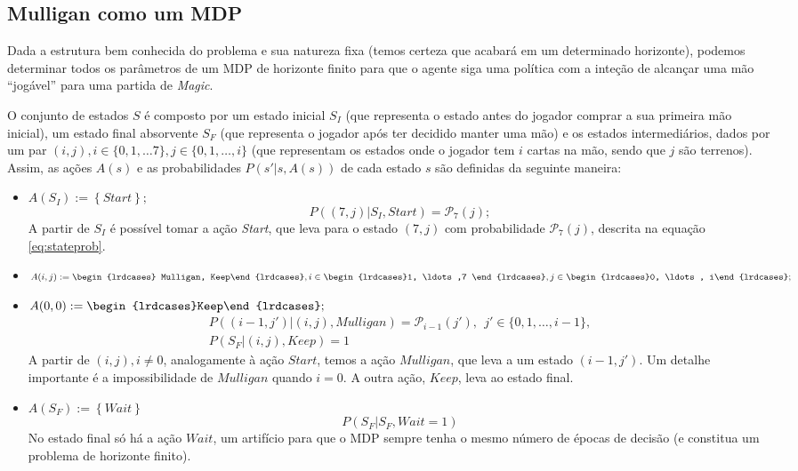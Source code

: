 \documentclass[dvipsnames]{book}
\begin{document}
\pagebreak
\subsection{Mulligan como um MDP}

Dada a estrutura bem conhecida do problema e sua natureza fixa (temos certeza que acabará em um
determinado horizonte), podemos determinar todos os parâmetros de um MDP de horizonte finito para
que o agente siga uma política com a inteção de alcançar uma mão ``jogável'' para uma partida de
\textit{Magic}.

O conjunto de estados $S$ é composto por um estado inicial $S_I$ (que representa o estado antes
do jogador comprar a sua primeira mão inicial), um estado final absorvente $S_F$ (que representa
o jogador após ter decidido manter uma mão) e os estados intermediários, dados por um par $(i, j),
i \in \{ 0, 1, \ldots 7\}, j \in \{ 0, 1, \ldots, i \}$ (que representam os estados onde o jogador
tem $i$ cartas na mão, sendo que $j$ são terrenos). Assim, as ações $A(s)$ e as probabilidades
$P(s'|s, A(s))$ de cada estado $s$ são definidas da seguinte maneira:

\begin{itemize}
  \item $A(S_I) := \left\{ Start \right\};$
  \begin{equation*}
    P((7, j) | S_I, Start) =  \mathcal{P}_7(j);
  \end{equation*}
   A partir de $S_I$ é possível tomar a ação \textit{Start}, que leva para o estado $(7, j)$ com
   probabilidade $\mathcal{P}_7(j)$, descrita na equação \ref{eq:stateprob}.
  \item $A(i, j):= \begin{lrdcases} Mulligan, Keep\end{lrdcases}, i\in\begin{lrdcases}1, \ldots ,7 \end{lrdcases}, j \in \begin{lrdcases}0, \ldots, i\end{lrdcases};$
  \item $A(0, 0):=\begin{lrdcases}Keep\end{lrdcases};$
  \begin{gather*}
    P((i - 1, j')| (i, j), Mulligan) = \mathcal{P}_{i-1}(j'),\ \ j' \in \{0,1, \ldots, i-1\},\\
    P(S_F|(i, j), Keep) = 1
  \end{gather*}
   A partir de $(i, j), i \neq 0$, analogamente à ação $Start$, temos a ação $Mulligan$, que leva a um estado
   $(i -1, j')$. Um detalhe importante é a impossibilidade de $Mulligan$ quando $i = 0$. A outra ação,
   $Keep$, leva ao estado final.
   \item $A(S_F) := \left\{ Wait \right\}$
   \begin{equation*}
     P(S_F | S_F, Wait = 1)
   \end{equation*}
   No estado final só há a ação $Wait$, um artifício para que o MDP sempre tenha o mesmo número de
   épocas de decisão (e constitua um problema de horizonte finito).
\end{itemize}
\end{document}
